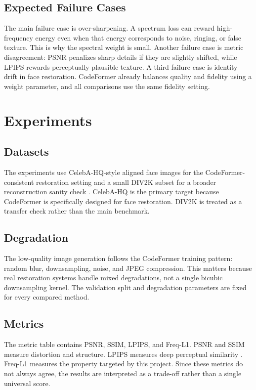 \documentclass[10pt,twocolumn,letterpaper]{article}
\begin{document}
\subsection{Expected Failure Cases}
The main failure case is over-sharpening. A spectrum loss can reward high-frequency energy even when that energy corresponds to noise, ringing, or false texture. This is why the spectral weight is small. Another failure case is metric disagreement: PSNR penalizes sharp details if they are slightly shifted, while LPIPS rewards perceptually plausible texture. A third failure case is identity drift in face restoration. CodeFormer already balances quality and fidelity using a weight parameter, and all comparisons use the same fidelity setting.

\section{Experiments}
\subsection{Datasets}
The experiments use CelebA-HQ-style aligned face images for the CodeFormer-consistent restoration setting and a small DIV2K subset for a broader reconstruction sanity check \cite{karras2018celebahq,agustsson2017div2k}. CelebA-HQ is the primary target because CodeFormer is specifically designed for face restoration. DIV2K is treated as a transfer check rather than the main benchmark.

\subsection{Degradation}
The low-quality image generation follows the CodeFormer training pattern: random blur, downsampling, noise, and JPEG compression. This matters because real restoration systems handle mixed degradations, not a single bicubic downsampling kernel. The validation split and degradation parameters are fixed for every compared method.

\subsection{Metrics}
The metric table contains PSNR, SSIM, LPIPS, and Freq-L1. PSNR and SSIM measure distortion and structure. LPIPS measures deep perceptual similarity \cite{zhang2018lpips}. Freq-L1 measures the property targeted by this project. Since these metrics do not always agree, the results are interpreted as a trade-off rather than a single universal score.
\end{document}
